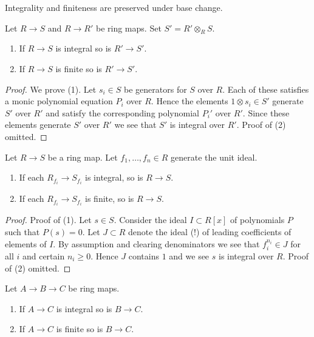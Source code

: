 \begin{lemma}
\label{lemma-base-change-integral}
\begin{slogan}
Integrality and finiteness are preserved under base change.
\end{slogan}
Let $R \to S$ and $R \to R'$ be ring maps.
Set $S' = R' \otimes_R S$.
\begin{enumerate}
\item If $R \to S$ is integral so is $R' \to S'$.
\item If $R \to S$ is finite so is $R' \to S'$.
\end{enumerate}
\end{lemma}

\begin{proof}
We prove (1).
Let $s_i \in S$ be generators for $S$ over $R$.
Each of these satisfies a monic polynomial equation $P_i$
over $R$. Hence the elements $1 \otimes s_i \in S'$ generate
$S'$ over $R'$ and satisfy the corresponding polynomial
$P_i'$ over $R'$. Since these elements generate $S'$ over $R'$
we see that $S'$ is integral over $R'$.
Proof of (2) omitted.
\end{proof}

\begin{lemma}
\label{lemma-integral-local}
Let $R \to S$ be a ring map.
Let $f_1, \ldots, f_n \in R$ generate the unit ideal.
\begin{enumerate}
\item If each $R_{f_i} \to S_{f_i}$ is integral, so is $R \to S$.
\item If each $R_{f_i} \to S_{f_i}$ is finite, so is $R \to S$.
\end{enumerate}
\end{lemma}

\begin{proof}
Proof of (1).
Let $s \in S$. Consider the ideal $I \subset R[x]$ of
polynomials $P$ such that $P(s) = 0$. Let $J \subset R$
denote the ideal (!) of leading coefficients of elements of $I$.
By assumption and clearing denominators
we see that $f_i^{n_i} \in J$ for all $i$
and certain $n_i \geq 0$. Hence $J$ contains $1$ and we see
$s$ is integral over $R$. Proof of (2) omitted.
\end{proof}

\begin{lemma}
\label{lemma-integral-permanence}
Let $A \to B \to C$ be ring maps.
\begin{enumerate}
\item If $A \to C$ is integral so is $B \to C$.
\item If $A \to C$ is finite so is $B \to C$.
\end{enumerate}
\end{lemma}

